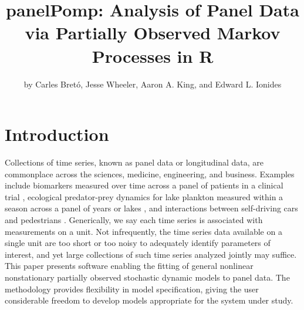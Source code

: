 \title{panelPomp: Analysis of Panel Data via Partially Observed Markov Processes in R}


\author{by Carles Bretó, Jesse Wheeler, Aaron A. King, and Edward L. Ionides}

\maketitle


\section{Introduction}\label{introduction}

Collections of time series, known as panel data or longitudinal data, are commonplace across the sciences, medicine, engineering, and business.
Examples include biomarkers measured over time across a panel of patients in a clinical trial \citep{ranjeva17, ranjeva19},
ecological predator-prey dynamics for lake plankton measured within a season across a panel of years or lakes \citep{marino19},
and interactions between self-driving cars and pedestrians \citep{domeyer22}.
Generically, we say each time series is associated with measurements on a unit.
Not infrequently, the time series data available on a single unit are too short or too noisy to adequately identify parameters of interest, and yet large collections of such time series analyzed jointly may suffice.
This paper presents software enabling the fitting of general nonlinear nonstationary partially observed stochastic dynamic models to panel data.
The methodology provides flexibility in model specification, giving the user considerable freedom to develop models appropriate for the system under study.

